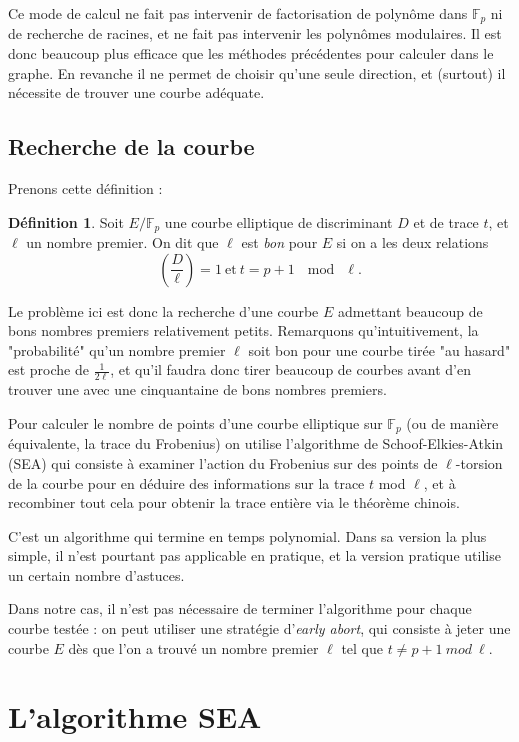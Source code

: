 \documentclass[11pt,a4paper]{article}
\newcommand{\F}{\mathbb{F}}
\theoremstyle{definition}
\newtheorem{defi}[thm]{Définition}
\begin{document}
Ce mode de calcul ne fait pas intervenir de factorisation de polynôme dans $\F_p$ ni de recherche de racines, et ne fait pas intervenir les polynômes modulaires. Il est donc beaucoup plus efficace que les méthodes précédentes pour calculer dans le graphe. En revanche il ne permet de choisir qu'une seule direction, et (surtout) il nécessite de trouver une courbe adéquate.

\subsection{Recherche de la courbe}

Prenons cette définition :

\begin{defi}
Soit $E/\F_p$ une courbe elliptique de discriminant $D$ et de trace $t$, et $\ell$ un nombre premier. On dit que $\ell$ est \emph{bon} pour $E$ si on a les deux relations
$$ \left(\frac{D}{\ell}\right)=1\ \text{et}\ t=p+1\ \mod\ \ell.$$
\end{defi}

Le problème ici est donc la recherche d'une courbe $E$ admettant beaucoup de bons nombres premiers relativement petits. Remarquons qu'intuitivement, la "probabilité" qu'un nombre premier $\ell$ soit bon pour une courbe tirée "au hasard" est proche de $\frac{1}{2\ell}$, et qu'il faudra donc tirer beaucoup de courbes avant d'en trouver une avec une cinquantaine de bons nombres premiers.

Pour calculer le nombre de points d'une courbe elliptique sur $\F_p$ (ou de manière équivalente, la trace du Frobenius) on utilise l'algorithme de Schoof-Elkies-Atkin (SEA) qui consiste à examiner l'action du Frobenius sur des points de $\ell$-torsion de la courbe pour en déduire des informations sur la trace $t$ mod $\ell$, et à recombiner tout cela pour obtenir la trace entière via le théorème chinois.

C'est un algorithme qui termine en temps polynomial. Dans sa version la plus simple, il n'est pourtant pas applicable en pratique, et la version pratique utilise un certain nombre d'astuces.

Dans notre cas, il n'est pas nécessaire de terminer l'algorithme pour chaque courbe testée : on peut utiliser une stratégie d'\emph{early abort}, qui consiste à jeter une courbe $E$ dès que l'on a trouvé un nombre premier $\ell$ tel que $t\neq p+1\ mod\ \ell.$

\newpage

\section{L'algorithme SEA}
\end{document}
